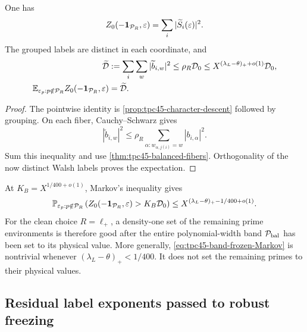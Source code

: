 \begin{corollary}
\label{cor:tpc45-grouped-diagonal}
One has
\begin{equation}
 Z_0(-\mathbf 1_{\mathcal P_R},\varepsilon)
 =\sum_i|\widetilde S_i(\varepsilon)|^2.
 \label{eq:tpc45-grouped-packet-identity}
\end{equation}
The grouped labels are distinct in each coordinate, and
\begin{align}
 \widetilde{\mathcal D}
 &:=\sum_i\sum_w|\widetilde b_{i,w}|^2
 \le\rho_R\mathcal D_0
 \le X^{(\lambda_L-\theta)_++o(1)}\mathcal D_0,
 \label{eq:tpc45-grouped-diagonal-bound}\\
 \mathbb E_{\varepsilon_p:p\notin\mathcal P_R}
 Z_0(-\mathbf 1_{\mathcal P_R},\varepsilon)
 &=\widetilde{\mathcal D}.
 \label{eq:tpc45-band-frozen-mean}
\end{align}
\end{corollary}

\begin{proof}
The pointwise identity is
\cref{prop:tpc45-character-descent} followed by grouping.  On each
fiber, Cauchy--Schwarz gives
\[
 |\widetilde b_{i,w}|^2
 \le\rho_R
 \sum_{\alpha:w_{\alpha,j(i)}=w}|b_{i,\alpha}|^2.
\]
Sum this inequality and use \cref{thm:tpc45-balanced-fibers}.
Orthogonality of the now distinct Walsh labels proves the expectation.
\end{proof}

At \(K_B=X^{1/400+o(1)}\), Markov's inequality gives
\begin{equation}
 \mathbb P_{\varepsilon_p:p\notin\mathcal P_R}
 \left(
 Z_0(-\mathbf 1_{\mathcal P_R},\varepsilon)>K_B\mathcal D_0
 \right)
 \le X^{(\lambda_L-\theta)_+-1/400+o(1)}.
 \label{eq:tpc45-band-frozen-Markov}
\end{equation}
For the clean choice \(R=\ell_+\), a density-one set of the remaining
prime environments is therefore good after the entire polynomial-width
band \(\mathcal P_{\rm bal}\) has been set to its physical value.  More
generally, \eqref{eq:tpc45-band-frozen-Markov} is nontrivial whenever
\((\lambda_L-\theta)_+<1/400\).  It does not set the remaining primes to
their physical values.

\subsection{Residual label exponents passed to robust freezing}

